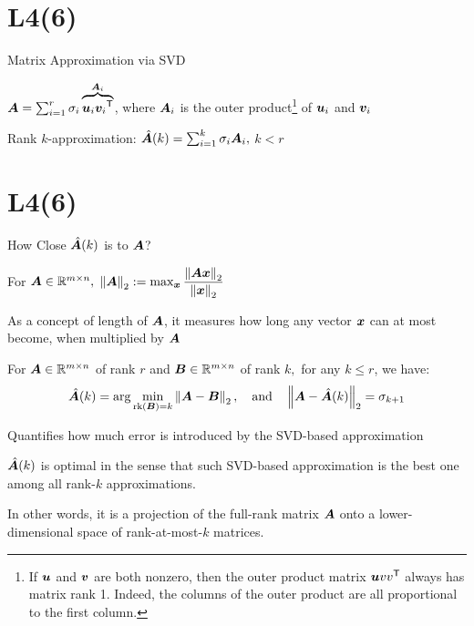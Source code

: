 \documentclass[handout,fleqn,aspectratio=169]{beamer}
\begin{document}
\section{L4(6)}
\begin{frame}{Matrix Approximation via SVD}

\plitemsep 0.1in
\vspace{-0.6cm}
\bci 
\item $\bm{A} = \sum_{i=1}^r \sigma_i \overbrace{\bm{u}_i {\bm{v}_i}^{\mathsf{T}}}^{\bm{A}_i}$, where $\bm{A}_i$ is the outer product\footnote{If $\bm{u}$ and $\bm{v}$ are both nonzero, then the outer product matrix $\bm{u} {vv}^{\mathsf{T}}$ always has matrix rank 1. Indeed, the columns of the outer product are all proportional to the first column.} of $\bm{u}_i$ and $\bm{v}_i$

\item Rank $k$-approximation: $\hat{\bm{A}}(k) = \sum_{i=1}^k \sigma_i \bm{A}_i,$ $k < r$ 
\eci
\end{frame}

\section{L4(6)}
\begin{frame}{How Close $\hat{\bm{A}}(k)$ is to $\bm{A}$?}

\plitemsep 0.07in
\bci 
\item {} {} For $\bm{A} \in {\mathbb R}^{m \times n},$ 
$\left \lVert \bm{A} \right \rVert_2 := \max_{\bm{x}} \dfrac{\left \lVert \bm{A} \bm{x} \right \rVert_2}{\left \lVert \bm{x} \right \rVert_2}$
\bci
\item As a concept of length of $\bm{A}$, it measures how long any vector $\bm{x}$ can at most become, when multiplied by $\bm{A}$
\eci
\item \thm {} For $\bm{A} \in {\mathbb R}^{m \times n}$ of rank $r$ and $\bm{B} \in {\mathbb R}^{m \times n}$ of rank $k,$ for any $k \le r$, we have:
$$
\hat{\bm{A}}(k) = \arg \min_{\text{rk}(\bm{B}) = k} \left \lVert \bm{A} - \bm{B} \right \rVert_2, \quad \text{and} \quad \left \lVert \bm{A} - \hat{\bm{A}}(k) \right \rVert_2 = \sigma_{k+1}
$$
\bci
\item Quantifies how much error is introduced by the SVD-based approximation
\item $\hat{\bm{A}}(k)$ is optimal in the sense that such SVD-based approximation is the best 
one among all rank-$k$ approximations. 

\item In other words, it is a projection of the full-rank matrix $\bm{A}$ onto a lower-dimensional space of rank-at-most-$k$ matrices.
\eci

\eci
\end{frame}
\end{document}
